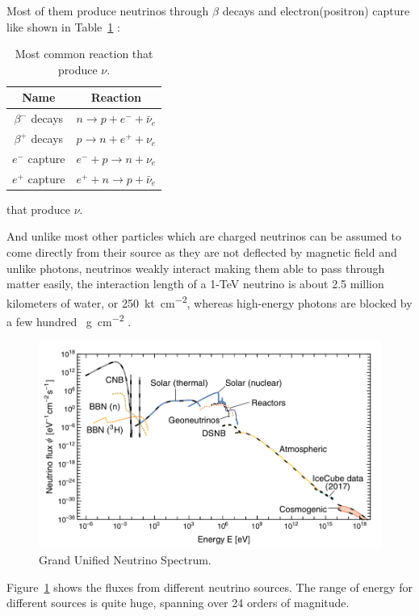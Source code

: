 Most of them produce neutrinos through $\beta$ decays and electron(positron) capture like shown in Table~\ref{tab:reaction}  :
\begin{table}[H]
	\centering
	\caption{Most common reaction that produce $\nu$.}
	\label{tab:reaction}
	\begin{tabular}{cc}
		\toprule
		Name & Reaction \\
		\midrule
		$\beta^-$ decays & $n\rightarrow p+e^-+\bar\nu_e$ \\
		$\beta^+$ decays & $p\rightarrow n+e^++\nu_e$ \\
		$e^-$ capture & $e^-+p\rightarrow n+\nu_e$ \\
		$e^+$ capture & $e^++n\rightarrow p+\bar\nu_e$ \\
		\bottomrule
	\end{tabular}
\end{table}
that produce $\nu$.

And unlike most other particles which are charged neutrinos can be assumed to come directly from their source as they are not deflected by magnetic field and unlike photons, neutrinos weakly interact making them able to pass through matter easily, the interaction length of a 1-TeV neutrino is about 2.5 million kilometers of water, or \SI{250}{\kilo\tonne\per\centi\meter\squared}, whereas high-energy photons are blocked by a few hundred \SI{}{\gram\per\centi\meter\squared} .
\begin{figure}[H]
	\centering
	\includegraphics[width=\textwidth]{assets/GUNS.png}
	\caption{Grand Unified Neutrino Spectrum.}
	\label{Graph:Guns}
\end{figure}

Figure~\ref{Graph:Guns}  shows the fluxes from different neutrino sources. The range of energy for different sources is quite huge, spanning over 24 orders of magnitude. 

